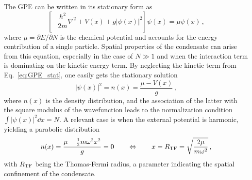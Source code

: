 The GPE can be written in its stationary form as
\begin{equation}
    \left[ 
        -\frac{\hbar^2}{2m}\nabla^2 + V(x) + g|\psi(x)|^2
    \right] \psi(x) = \mu \psi(x)\, ,
    \label{eq:GPE_stat}
\end{equation}
where $\mu = \partial E/\partial N$ is the chemical potential and accounts for the energy contribution of a single particle. Spatial properties of the condensate can arise from this equation, especially in the case of $N \gg 1$ and when the interaction term is dominating on the kinetic energy term. By neglecting the kinetic term from Eq.\ \eqref{eq:GPE_stat}, one easily gets the stationary solution
\[
    |\psi(x)|^2 = n(x) = \frac{\mu - V(x)}{g}\, ,
\]
where $n(x)$ is the density distribution, and the association of the latter with the square modulus of the wavefunction leads to the normalization condition $\int |\psi(x)|^2 \dd x = N$. A relevant case is when the external potential is harmonic, yielding a parabolic distribution
\begin{equation}
    n(x) = \frac{\mu - \frac{1}{2}m\omega^2x^2}{g} = 0 \qquad
    \Leftrightarrow \qquad
    x = R_{\rm TF} = \sqrt{\frac{2\mu}{m\omega^2}}\, ,
    \label{eq:TF}
\end{equation}
with $R_{\rm TF}$ being the Thomas-Fermi radius, a parameter indicating the spatial confinement of the condensate.



